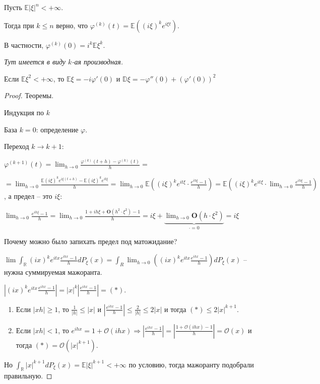 \begin{theorem}
    Пусть $\mathbb{E} |\xi|^n < +\infty$.

    Тогда при $k \leqslant n$ верно, что $\varphi^{(k)} (t) = \mathbb{E} ((i\xi)^k e^{i\xi t}) $.

    В частности, $\varphi^{(k)} (0) = i^k \mathbb{E} \xi^k$.

    \textit{Тут имеется в виду $k$-ая производная.}
\end{theorem}

\begin{consequence}
    Если $\mathbb{E} \xi^2 < + \infty$, то $\mathbb{E} \xi = -i \varphi'(0)$ и $\mathbb{D} \xi = -\varphi''(0) + (\varphi'(0))^2$
\end{consequence}

\begin{proof}
    Теоремы.

    Индукция по $k$

    База $k = 0$: определение $\varphi$.

    Переход $k \to k + 1$:

    $\varphi^{(k + 1)}(t) = \lim_{h \to 0} \frac{\varphi^{(k)}(t + h) - \varphi^{(k)}(t)}{h} = $

    $= \lim_{h \to 0} \frac{\mathbb{E} (i \xi)^k e^{i\xi(t + h)} - \mathbb{E} (i \xi)^k e^{it\xi}}{h} =
    \lim_{h \to 0} \mathbb{E} ((i \xi)^k e^{i t \xi} \cdot \frac{e^{ih\xi} - 1}{h}) = \mathbb{E} ((i\xi)^k e^{i t \xi} \cdot \lim_{h \to 0} \frac{e^{i h \xi} - 1}{h})$, а предел -- это $i \xi$:

    $\lim_{h \to 0} \frac{e^{ih\xi} - 1}{h} = \lim_{h \to 0} \frac{1 + ih\xi + \mathbf{O}(h^2\cdot \xi^2) - 1}{h} = i\xi + \underbrace{\lim_{h \to 0} \mathbf{O}(h \cdot \xi^2)}_{\cdot=0} = i\xi$

    Почему можно было запихать предел под матожидание?

    $\lim \int_{\mathbb{R}} (ix)^k e^{itx} \frac{e^{ihx} - 1}{h} d P_{\xi}(x) = \int_{R} \lim_{h \to 0} ((ix)^k e^{itx} \frac{e^{ihx} - 1}{h}) d P_{\xi}(x)$ -- нужна суммируемая мажоранта.

    $\left | (ix)^k e^{itx} \frac{e^{ihx} - 1}{h}  \right | = |x|^k \left | \frac{e^{ihx} - 1}{h} \right | = (*)$.

    \begin{enumerate}
        \item {
            Если $|xh| \geqslant 1$, то $\frac{1}{|h|} \leq |x|$ и $\left | \frac{e^{ihx} - 1}{h} \right | \leqslant \frac{2}{|h|} \leqslant 2|x| $ и тогда $(*) \leq 2|x|^{k + 1}$.
        }
        \item {
            Если $|xh| < 1$, то $e^{ihx} = 1 + \mathcal{O}(ihx) \Rightarrow \left | \frac{e^{ihx} - 1}{h}  \right | = \left | \frac{1 + \mathcal{O}(ihx) - 1}{h}  \right | = \mathcal{O}(x)$ и тогда $(*) = \mathcal{O}(|x|^{k + 1})$.
        }
    \end{enumerate}

    Но $\int_{\mathbb{R}} |x|^{k + 1} d P_{\xi} (x) = \mathbb{E} |\xi|^{k + 1} < +\infty$ по условию, тогда мажоранту подобрали правильную.
\end{proof}

